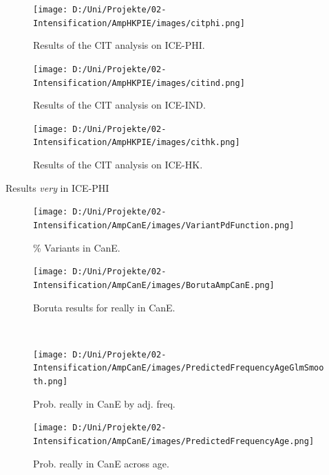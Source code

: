 \documentclass[12pt, table]{beamer}
\begin{document}
\begin{frame}
\begin{figure}[!htb]
\centering
\texttt{[image: D:/Uni/Projekte/02-Intensification/AmpHKPIE/images/citphi.png]}
\caption{\tiny Results of the CIT analysis on ICE-PHI.}
\label{fig:VariantAgeFunctionCorpus}
\end{figure} 
\end{frame} 

\begin{frame}
\begin{figure}[!htb]
\centering
\texttt{[image: D:/Uni/Projekte/02-Intensification/AmpHKPIE/images/citind.png]}
\caption{\tiny Results of the CIT analysis on ICE-IND.}
\label{fig:VariantAgeFunctionCorpus}
\end{figure} 
\end{frame} 

\begin{frame}
\begin{figure}[!htb]
\centering
\texttt{[image: D:/Uni/Projekte/02-Intensification/AmpHKPIE/images/cithk.png]}
\caption{\tiny Results of the CIT analysis on ICE-HK.}
\label{fig:VariantAgeFunctionCorpus}
\end{figure} 
\end{frame} 



\begin{frame}
Results \textit{very} in ICE-PHI
\begin{figure}[!htb]
\centering
\begin{minipage}{0.4\textwidth}
\centering
\texttt{[image: D:/Uni/Projekte/02-Intensification/AmpCanE/images/VariantPdFunction.png]}
\caption{\tiny \% Variants in CanE.}
\label{fig:VariantAgeCanE}
\end{minipage}
\begin{minipage}{0.55\textwidth}
\centering
\texttt{[image: D:/Uni/Projekte/02-Intensification/AmpCanE/images/BorutaAmpCanE.png]}
\caption{\tiny Boruta results for really in CanE.}
\label{fig:BorutaCanE}
\end{minipage}\\
\begin{minipage}{0.45\textwidth}
\centering
\texttt{[image: D:/Uni/Projekte/02-Intensification/AmpCanE/images/PredictedFrequencyAgeGlmSmooth.png]}
\caption{\tiny Prob. really in CanE by adj. freq.}
\label{fig:ReallyCanEFrequency}
\end{minipage}
\begin{minipage}{0.45\textwidth}
\centering
\texttt{[image: D:/Uni/Projekte/02-Intensification/AmpCanE/images/PredictedFrequencyAge.png]}
\caption{\tiny Prob. really in CanE across age.}
\label{fig:ReallyCanEAge}
\end{minipage}
\end{figure} 
\end{frame} 
\end{document}
